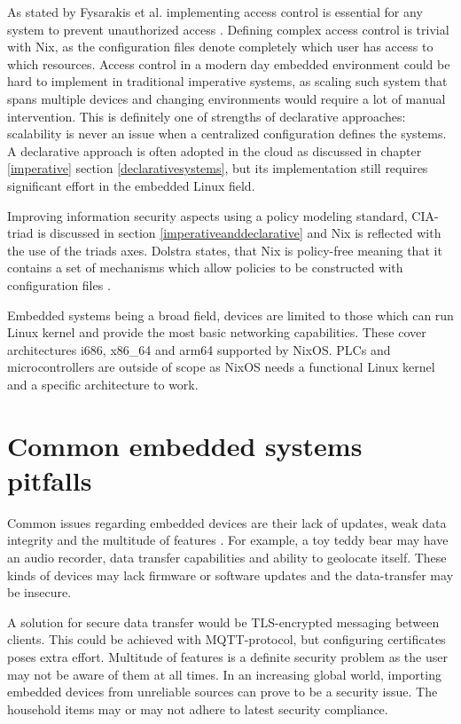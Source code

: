 As stated by Fysarakis et al. implementing access control is essential
for any system to prevent unauthorized access
\cite{fysarakis2014embedded}. Defining complex access control is
trivial with Nix, as the configuration files denote completely which
user has access to which resources. Access control in a modern day
embedded environment could be hard to implement in traditional
imperative systems, as scaling such system that spans multiple devices
and changing environments would require a lot of manual
intervention. This is definitely one of strengths of declarative
approaches: scalability is never an issue when a centralized
configuration defines the systems. A declarative approach is often
adopted in the cloud as discussed in chapter \ref{imperative}
section \ref{declarativesystems}, but its implementation still
requires significant effort in the embedded Linux field.

Improving information security aspects using a policy
modeling standard, CIA-triad is discussed in section
\ref{imperativeanddeclarative} and Nix is reflected with the use of
the triads axes. Dolstra states, that Nix is policy-free meaning that
it contains a set of mechanisms which allow policies to be constructed
with configuration files \cite{dolstra2004nix}.

Embedded systems being a broad field,  devices are limited to
those which can run Linux kernel and provide the most basic networking
capabilities. These cover architectures i686, x86\_64 and arm64 supported
by NixOS. PLCs and microcontrollers are outside of scope as NixOS
needs a functional Linux kernel and a specific architecture to work.

\section{Common embedded systems pitfalls}

Common issues regarding embedded devices are their lack of updates,
weak data integrity and the multitude of features
\cite{kemmerer2003cybersecurity, fysarakis2014embedded}. For example,
a toy teddy bear may have an audio recorder, data transfer capabilities
and ability to geolocate itself. These kinds of devices may lack
firmware or software updates and the data-transfer may be insecure.

A solution for secure data transfer would be TLS-encrypted messaging
between clients. This could be achieved with MQTT-protocol, but
configuring certificates poses extra effort. Multitude of features is a
definite security problem as the user may not be aware of them at all
times. In an increasing global world, importing embedded devices from
unreliable sources can prove to be a security issue. The household
items may or may not adhere to latest security
compliance. \cite{fysarakis2014embedded}

